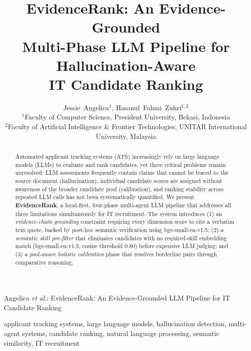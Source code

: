 \documentclass[journal]{IEEEtran}
\begin{document}
\title{EvidenceRank: An Evidence-Grounded\\
Multi-Phase LLM Pipeline for Hallucination-Aware\\
IT Candidate Ranking}

\author{Jessie~Angelica$^{1}$, Hasanul~Fahmi~Zuhri$^{1,2}$\\[4pt]
$^{1}$Faculty of Computer Science, President University, Bekasi, Indonesia\\[2pt]
$^{2}$Faculty of Artificial Intelligence \& Frontier Technologies,
UNITAR International University, Malaysia}

%
{Angelica \textit{et al.}: EvidenceRank: An Evidence-Grounded LLM Pipeline for IT Candidate Ranking}

\maketitle

\begin{abstract}
Automated applicant tracking systems (ATS) increasingly rely on large language
models (LLMs) to evaluate and rank candidates, yet three critical problems remain
unresolved: LLM assessments frequently contain claims that cannot be traced to the
source document (hallucination), individual candidate scores are assigned without
awareness of the broader candidate pool (calibration), and ranking stability across
repeated LLM calls has not been systematically quantified. We present
\textbf{EvidenceRank}, a local-first, four-phase multi-agent LLM pipeline that
addresses all three limitations simultaneously for IT recruitment. The system
introduces (1) an \emph{evidence-chain grounding}
constraint requiring every dimension score to cite a verbatim text quote, backed by
post-hoc semantic verification using bge-small-en-v1.5; (2) a \emph{semantic skill
pre-filter} that eliminates candidates with no required-skill embedding match
(bge-small-en-v1.5, cosine threshold 0.80) before expensive LLM judging; and (3) a \emph{pool-aware holistic
calibration} phase that resolves borderline pairs through comparative reasoning.
\end{abstract}

\begin{IEEEkeywords}
applicant tracking systems, large language models, hallucination detection, multi-agent systems, candidate ranking, natural language
processing, semantic similarity, IT recruitment
\end{IEEEkeywords}
\end{document}
